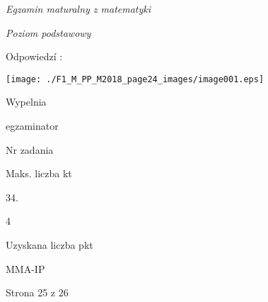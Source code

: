 \documentclass[a4paper,12pt]{article}
\begin{document}
{\it Egzamin maturalny z matematyki}

{\it Poziom podstawowy}

Odpowiedzí :
\begin{center}
\texttt{[image: ./F1\_M\_PP\_M2018\_page24\_images/image001.eps]}
\end{center}
Wypelnia

egzaminator

Nr zadania

Maks. liczba kt

34.

4

Uzyskana liczba pkt

MMA-IP

Strona 25 z 26
\end{document}
